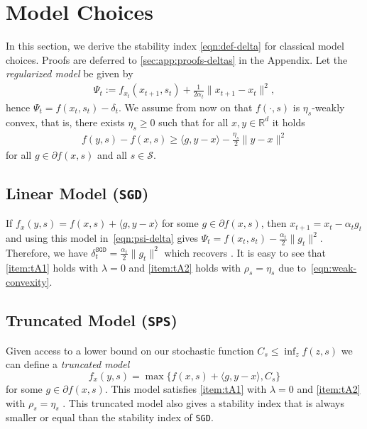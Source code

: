 \documentclass{article}
\newcommand{\iprod}[2]{\langle #1, #2 \rangle}
\newcommand{\R}{\mathbb{R}}
\newcommand{\E}{\mathbb{E}}
\newcommand{\SGD}{{\texttt{SGD}}}
\newcommand{\SPS}{{\texttt{SPS}}}
\theoremstyle{plain}
\theoremstyle{definition}
\theoremstyle{remark}
\begin{document}
\section{Model Choices}\label{sec:models}
%
In this section, we derive the stability index \eqref{eqn:def-delta} for classical model choices.
Proofs are deferred to \cref{sec:app:proofs-deltas} in the Appendix. Let the \emph{regularized model} be given by
\begin{align}\label{eqn:psi-delta}
\Psi_t:=f_{x_t}(x_{t+1},s_t) + \frac{1}{2\alpha_t}\|x_{t+1}-x_t\|^2,
\end{align}
hence $\Psi_t= f(x_t,s_t) - \delta_t$.
%
We assume from now on that $f(\cdot,s)$ is $\eta_s$-weakly convex, that is, there exists $\eta_s \geq 0$ such that for all $x,y \in \R^d$ it holds
\begin{align}\label{eqn:weak-convexity}
    f(y,s) - f(x,s) \geq \iprod{g}{y-x} - \frac{\eta_s}{2} \|y-x\|^2
\end{align}
for all $g\in \partial f(x,s)$ and all $s\in \mathcal{S}$.

%
\subsection{Linear Model (\SGD{})} \label{sec:linearmodel}
%
If $f_x(y,s)=f(x,s) + \iprod{g}{y-x}$ for some $g\in \partial f(x,s)$, then $x_{t+1} = x_t -\alpha_t g_t$ and using this model in~\eqref{eqn:psi-delta} gives
$\Psi_t = f(x_t, s_t) - \frac{\alpha_t}{2}\|g_t\|^2.$
Therefore, we have $\delta_t^{\SGD{}} = \frac{\alpha_t}{2}\|g_t\|^2$ which recovers \citet[Thm.\ 3.1]{Schaipp2025}.
It is easy to see that \ref{item:tA1} holds with $\lambda=0$ and \ref{item:tA2} holds with $\rho_s=\eta_s$ due to~\eqref{eqn:weak-convexity}.
%
\subsection{Truncated Model (\SPS{})}\label{sec:spsmodel}
%
Given access to a lower bound on our stochastic function $C_s\leq \inf_z f(z,s)$ we can define a \emph{truncated model}
\begin{equation}\label{eq:truncated-model}
    f_x(y,s)=\max\{f(x,s) + \iprod{g}{y-x}, C_s\}
\end{equation}  
for some $g\in \partial f(x,s)$.
This model satisfies \ref{item:tA1} with $\lambda=0$ and \ref{item:tA2} with $\rho_s=\eta_s$ \citep[Lem.\ 2]{Schaipp2023}. 
This truncated model also gives a stability index that is always smaller or equal than the stability index of \SGD{}.
\end{document}
